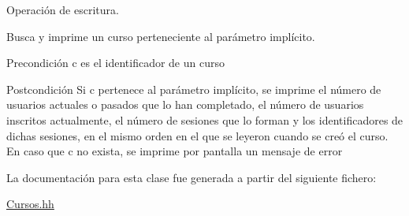 Operación de escritura. 

Busca y imprime un curso perteneciente al parámetro implícito. \begin{DoxyPrecond}{Precondición}
c es el identificador de un curso 
\end{DoxyPrecond}
\begin{DoxyPostcond}{Postcondición}
Si c pertenece al parámetro implícito, se imprime el número de usuarios actuales o pasados que lo han completado, el número de usuarios inscritos actualmente, el número de sesiones que lo forman y los identificadores de dichas sesiones, en el mismo orden en el que se leyeron cuando se creó el curso. En caso que c no exista, se imprime por pantalla un mensaje de error 
\end{DoxyPostcond}


La documentación para esta clase fue generada a partir del siguiente fichero\+:\begin{DoxyCompactItemize}
\item 
\mbox{\hyperlink{_cursos_8hh}{Cursos.\+hh}}\end{DoxyCompactItemize}
